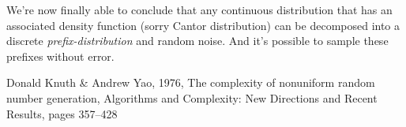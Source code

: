 \documentclass{article}
\begin{document}
We're now finally able to conclude that any continuous distribution that has an associated density function (sorry Cantor distribution) can be decomposed into a discrete \textit{prefix-distribution} and random noise. And it's possible to sample these prefixes without error.

\begin{thebibliography}{1}
Donald Knuth \& Andrew Yao, 1976, The complexity of nonuniform random number generation, Algorithms and
Complexity: New Directions and Recent Results, pages 357–428

\end{thebibliography}

\vfill\eject
\end{document}
